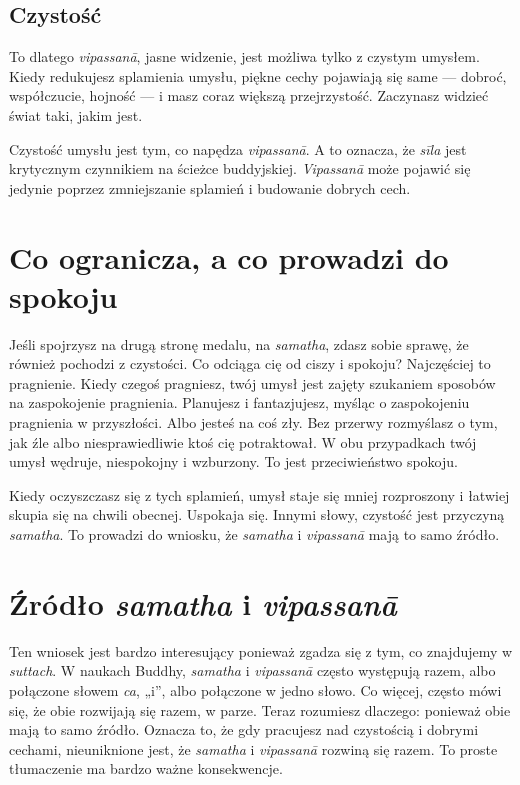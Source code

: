 \documentclass[12pt,openany]{book}
\begin{document}
\section*{Czystość}

To dlatego \textit{vipassanā}, jasne widzenie, jest możliwa tylko z czystym umysłem. Kiedy redukujesz splamienia umysłu, piękne cechy pojawiają się same --- dobroć, współczucie, hojność --- i masz coraz większą przejrzystość. Zaczynasz widzieć świat taki, jakim jest.

Czystość umysłu jest tym, co napędza \textit{vipassanā}. A to oznacza, że  \textit{sīla} jest krytycznym czynnikiem na ścieżce buddyjskiej. \textit{Vipassanā} może pojawić się jedynie poprzez zmniejszanie splamień i budowanie dobrych cech.

\chapter*{Co ogranicza, a co prowadzi do spokoju}

Jeśli spojrzysz na drugą stronę medalu, na \textit{samatha}, zdasz sobie sprawę, że również pochodzi z czystości. Co odciąga cię od ciszy i spokoju? Najczęściej to pragnienie. Kiedy czegoś pragniesz, twój umysł jest zajęty szukaniem sposobów na zaspokojenie pragnienia. Planujesz i fantazjujesz, myśląc o zaspokojeniu pragnienia w przyszłości. Albo jesteś na coś zły. Bez przerwy rozmyślasz o tym, jak źle albo niesprawiedliwie ktoś cię potraktował. W obu przypadkach twój umysł wędruje, niespokojny i wzburzony. To jest przeciwieństwo spokoju.

Kiedy oczyszczasz się z tych splamień, umysł staje się mniej rozproszony i łatwiej skupia się na chwili obecnej. Uspokaja się. Innymi słowy, czystość jest przyczyną \textit{samatha}. To prowadzi do wniosku, że \textit{samatha} i \textit{vipassanā} mają to samo źródło.

\chapter*{Źródło \textit{samatha} i \textit{vipassanā}}

Ten wniosek jest bardzo interesujący ponieważ zgadza się z tym, co znajdujemy w \textit{suttach}. W naukach Buddhy, \textit{samatha} i \textit{vipassanā} często występują razem, albo połączone słowem \textit{ca}, „i”, albo połączone w jedno słowo. Co więcej, często mówi się, że obie rozwijają się razem, w parze. Teraz rozumiesz dlaczego: ponieważ obie mają to samo źródło. Oznacza to, że gdy pracujesz nad czystością i dobrymi cechami, nieuniknione jest, że \textit{samatha} i \textit{vipassanā} rozwiną się razem. To proste tłumaczenie ma bardzo ważne konsekwencje.
\end{document}
